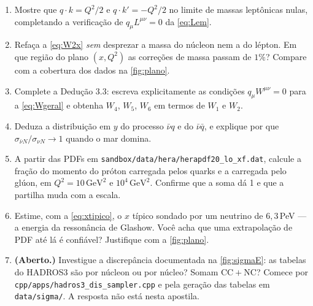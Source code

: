 \documentclass[11pt,a4paper,oneside]{report}
\newcommand{\gev}{\,\mathrm{GeV}}
\newcommand{\Qsq}{Q^{2}}
\begin{document}
\begin{enumerate}[leftmargin=*,itemsep=5pt]
\item Mostre que $q\cdot k = \Qsq/2$ e $q\cdot k' = -\Qsq/2$ no limite de massas
  leptônicas nulas, completando a verificação de $q_\mu L^{\mu\nu}=0$ da
  \cref{eq:Lem}.

\item Refaça a \cref{eq:W2x} \emph{sem} desprezar a massa do núcleon nem a do
  lépton. Em que região do plano $(x,\Qsq)$ as correções de massa passam de
  $1\%$? Compare com a cobertura dos dados na \cref{fig:plano}.

\item Complete a Dedução 3.3: escreva explicitamente as condições
  $q_\mu W^{\mu\nu}=0$ para a \cref{eq:Wgeral} e obtenha $W_4$, $W_5$, $W_6$ em
  termos de $W_1$ e $W_2$.

\item Deduza a distribuição em $y$ do processo $\bar\nu q$ e do $\bar\nu\bar q$,
  e explique por que $\sigma_{\bar\nu N}/\sigma_{\nu N} \to 1$ quando o mar
  domina.

\item A partir das PDFs em \texttt{sandbox/data/hera/herapdf20\_lo\_xf.dat},
  calcule a fração do momento do próton carregada pelos quarks e a carregada
  pelo glúon, em $\Qsq = 10\gev^2$ e $10^4\gev^2$. Confirme que a soma dá 1 e
  que a partilha muda com a escala.

\item Estime, com a \cref{eq:xtipico}, o $x$ típico sondado por um neutrino de
  $6{,}3\,$PeV --- a energia da ressonância de Glashow. Você acha que uma
  extrapolação de PDF até lá é confiável? Justifique com a \cref{fig:plano}.

\item \textbf{(Aberto.)} Investigue a discrepância documentada na
  \cref{fig:sigmaE}: as tabelas do HADROS3 são por núcleon ou por núcleo? Somam
  CC${}+{}$NC? Comece por \texttt{cpp/apps/hadros3\_dis\_sampler.cpp} e pela
  geração das tabelas em \texttt{data/sigma/}. A resposta não está nesta
  apostila.
\end{enumerate}

\cleardoublepage
{}
{}
\printbibliography[title={Referências}]
\end{document}
